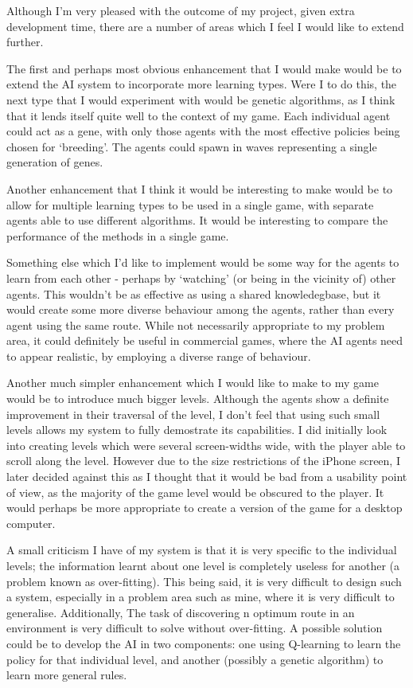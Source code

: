 \documentclass[a4paper,oneside]{report}
\begin{document}
Although I'm very pleased with the outcome of my project, given extra development time, there are a number of areas which I feel I would like to extend further.

The first and perhaps most obvious enhancement that I would make would be to extend the AI system to incorporate more learning types. Were I to do this, the next type that I would experiment with would be genetic algorithms, as I think that it lends itself quite well to the context of my game. Each individual agent could act as a gene, with only those agents with the most effective policies being chosen for `breeding'. The agents could spawn in waves representing a single generation of genes.

Another enhancement that I think it would be interesting to make would be to allow for multiple learning types to be used in a single game, with separate agents able to use different algorithms. It would be interesting to compare the performance of the methods in a single game. 

Something else which I'd like to implement would be some way for the agents to learn from each other - perhaps by `watching' (or being in the vicinity of) other agents. This wouldn't be as effective as using a shared knowledegbase, but it would create some more diverse behaviour among the agents, rather than every agent using the same route. While not necessarily appropriate to my problem area, it could definitely be useful in commercial games, where the AI agents need to appear realistic, by employing a diverse range of behaviour.

Another much simpler enhancement which I would like to make to my game would be to introduce much bigger levels. Although the agents show a definite improvement in their traversal of the level, I don't feel that using such small levels allows my system to fully demostrate its capabilities. I did initially look into creating levels which were several screen-widths wide, with the player able to scroll along the level. However due to the size restrictions of the iPhone screen, I later decided against this as I thought that it would be bad from a usability point of view, as the majority of the game level would be obscured to the player. It would perhaps be more appropriate to create a version of the game for a desktop computer.

A small criticism I have of my system is that it is very specific to the individual levels; the information learnt about one level is completely useless for another (a problem known as over-fitting). This being said, it is very difficult to design such a system, especially in a problem area such as mine, where it is very difficult to generalise. Additionally, The task of discovering n optimum route in an environment is very difficult to solve without over-fitting. A possible solution could be to develop the AI in two components: one using Q-learning to learn the policy for that individual level, and another (possibly a genetic algorithm) to learn more general rules. 
\end{document}
